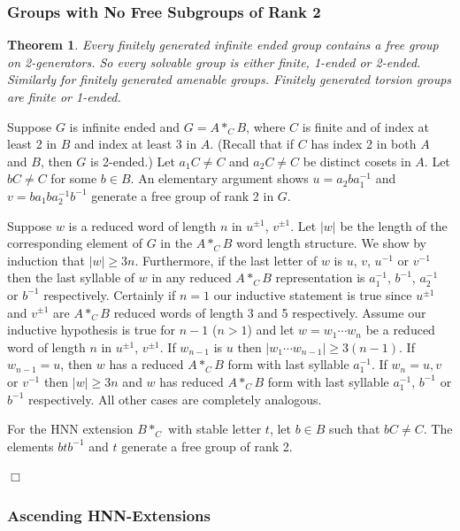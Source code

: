 \documentclass[12pt]{article}
\newtheorem{theorem}{Theorem}[subsection]
\newenvironment{proof}{\addvspace{12pt}\noindent{\bf Proof:}}{
$\Box$\par\addvspace{12pt}}
\begin{document}
\subsubsection{Groups with No Free Subgroups of Rank 2}\label{noF2}
\begin{theorem} \label{free} 
Every finitely generated infinite ended group contains a free group on 2-generators. So every solvable group is either finite, 1-ended or 2-ended. Similarly for finitely generated amenable groups. Finitely generated torsion groups are finite or 1-ended.
\end{theorem}
\begin{proof}
Suppose $G$ is infinite ended and $G=A\ast_C B$, where $C$ is finite and of index at least 2 in $B$ and index at least 3 in $A$. (Recall that if $C$ has index 2 in both $A$ and $B$, then $G$ is 2-ended.) Let $a_1C\ne C$ and $a_2C\ne C$ be distinct cosets in $A$. Let $bC\ne C$ for some $b\in B$. An elementary argument shows $u=a_2ba_1^{-1}$ and $v=ba_1ba_2^{-1}b^{-1}$ generate a free group of rank 2 in $G$. 

Suppose $w$ is a reduced word of length $n$ in $u^{\pm 1}$, $v^{\pm 1}$. Let $|w|$ be the length of the corresponding element of $G$ in the $A\ast_CB$ word length structure. We show by induction that $|w|\geq 3n$. Furthermore, if the last letter of $w$ is $u$, $v$, $u^{-1}$ or $v^{-1}$ then the last syllable of $w$ in any reduced $A\ast_CB$ representation is $a_1^{-1}$, $b^{-1}$, $a_2^{-1}$ or $b^{-1}$ respectively. Certainly if $n=1$ our inductive statement is true since $u^{\pm1}$ and $v^{\pm 1}$ are $A\ast_C B$ reduced words of length 3 and 5 respectively. Assume our inductive hypothesis is true for $n-1$ ($n>1$) and let $w=w_1\cdots w_n$ be a reduced word of length $n$ in $u^{\pm 1}$, $v^{\pm 1}$. If $w_{n-1}$ is $u$ then $|w_1\cdots w_{n-1}|\geq 3(n-1)$. If $w_{n-1}=u$,  then $w$ has a reduced $A\ast_CB$ form with last syllable $a_1^{-1}$. If $w_n=u,v$ or $v^{-1}$ then $|w|\geq 3n$ and $w$ has reduced $A\ast_CB$ form with last syllable $a_1^{-1}$, $b^{-1}$ or $b^{-1}$ respectively. All other cases are completely analogous. 

For the HNN extension $B\ast_C$ with stable letter $t$, let $b\in B$ such that $bC\ne C$. The elements $btb^{-1}$ and $t$ generate a free group of rank 2. 
\end{proof}

\subsubsection{Ascending HNN-Extensions} \label{AHNN}
\end{document}
